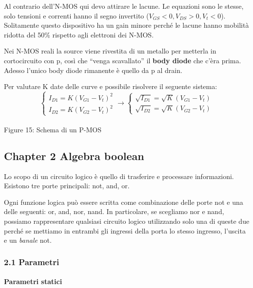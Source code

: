 \documentclass[
]{article}
\begin{document}
Al contrario dell'N-MOS qui devo attirare le lacune. Le equazioni sono
le stesse, solo tensioni e correnti hanno il segno invertito
(\(V_{GS}<0,V_{DS}>0,V_{t}<0\)). Solitamente questo dispositivo ha un
gain minore perché le lacune hanno mobilità ridotta del 50\% rispetto
agli elettroni dei N-MOS.

Nei N-MOS reali la source viene rivestita di un metallo per metterla in
cortocircuito con p, così che ``venga scavallato'' il \textbf{body
diode} che c'èra prima. Adesso l'unico body diode rimanente è quello da
p al drain.

Per valutare K date delle curve e possibile risolvere il seguente
sistema: \[
\begin{cases}
I_{D1}=K(V_{G1}-V_{t})^{2}\\
I_{D2}=K(V_{G2}-V_{t})^{2}\end{cases}\longrightarrow\begin{cases}\sqrt{I_{D1}}=\sqrt{K}(V_{G1}-V_{t})\\
\sqrt{I_{D2}}=\sqrt{K}(V_{G2}-V_{t})
\end{cases}
\]\\
Figure 15: Schema di un P-MOS

\newpage

\subsection{Chapter 2 Algebra boolean}\label{chapter-2-algebra-boolean}

Lo scopo di un circuito logico è quello di trasferire e processare
informazioni. Esistono tre porte principali: not, and, or.

Ogni funzione logica può essere scritta come combinazione delle porte
not e una delle seguenti: or, and, nor, nand. In particolare, se
scegliamo nor e nand, possiamo rappresentare qualsiasi circuito logico
utilizzando solo una di queste due perché se mettiamo in entrambi gli
ingressi della porta lo stesso ingresso, l'uscita e un \emph{banale}
not.

\subsubsection{2.1 Parametri}\label{parametri}

\paragraph{Parametri statici}\label{parametri-statici}
\end{document}
